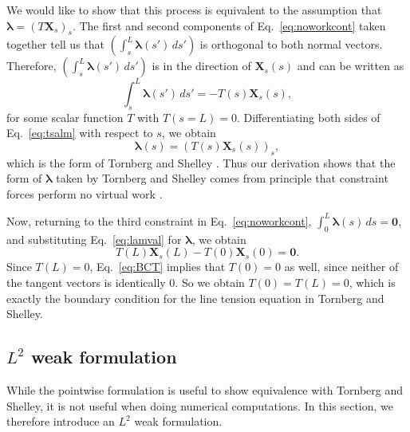 We would like to show that this process is equivalent to the assumption that $\bm{\lambda}=(T\bm{X}_s)_s$. The first and second components of Eq.\ \eqref{eq:noworkcont} taken together tell us that $\left(\int_{s}^L  \bm{\lambda}(s') \, ds'\right)$ is orthogonal to both normal vectors. Therefore, $\left(\int_{s}^L  \bm{\lambda}(s') \, ds'\right)$ is in the direction of $\bm{X}_s(s)$ and can be written as
\begin{equation}
\label{eq:tsalm}
\int_{s}^L  \bm{\lambda}(s') \, ds' = -T(s)\bm{X}_s(s),
\end{equation}
for some scalar function $T$ with $T(s=L)=0$. Differentiating both sides of Eq.\ \eqref{eq:tsalm} with respect to $s$, we obtain 
\begin{equation}
\label{eq:lamval}
\bm{\lambda}(s) = \left(T(s)\bm{X}_s(s)\right)_s, 
\end{equation}
which is the form of Tornberg and Shelley \cite{ts04}. Thus our derivation shows that the form of $\bm{\lambda}$ taken by Tornberg and Shelley comes from principle that constraint forces perform no virtual work \cite{varibook}. 

Now, returning to the third constraint in Eq.\ \eqref{eq:noworkcont}, $\int_0^L \bm{\lambda}(s) \, ds=\bm{0}$, and substituting Eq.\ \eqref{eq:lamval} for $\bm{\lambda}$, we obtain 
\begin{equation}
\label{eq:BCT}
T(L)\bm{X}_s(L) - T(0)\bm{X}_s(0)=\bm{0}. 
\end{equation}
Since $T(L)=0$, Eq.\ \eqref{eq:BCT} implies that $T(0)=0$ as well, since neither of the tangent vectors is identically 0. So we obtain $T(0)=T(L)=0$, which is exactly the boundary condition for the line tension equation in Tornberg and Shelley.

\subsection{$L^2$ weak formulation}
\label{sec:numinex}
While the pointwise formulation is useful to show equivalence with Tornberg and Shelley, it is not useful when doing numerical computations. In this section, we therefore introduce an $L^2$ weak formulation.

